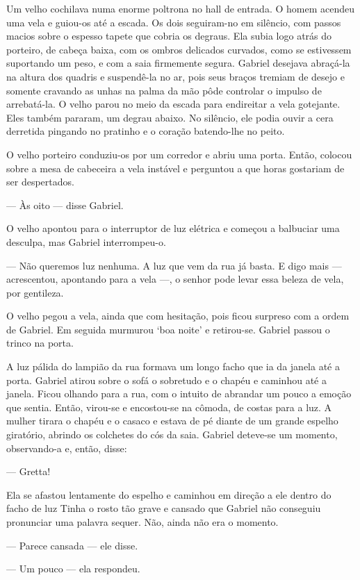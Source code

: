 Um velho cochilava numa enorme poltrona no hall de entrada. O homem
acendeu uma vela e guiou-os até a escada. Os dois seguiram-no em
silêncio, com  passos macios sobre o espesso tapete que cobria os
degraus. Ela subia logo atrás do porteiro, de cabeça baixa, com os
ombros delicados curvados, como se estivessem suportando um peso, e
com a saia firmemente segura. Gabriel desejava abraçá-la na altura dos
quadris e suspendê-la no ar, pois seus braços tremiam de desejo e
somente cravando as unhas na palma da mão pôde controlar o impulso de
arrebatá-la. O velho parou no meio da escada para endireitar a vela
gotejante. Eles também pararam, um degrau abaixo. No silêncio, ele
podia ouvir a cera derretida pingando no pratinho e o coração
batendo-lhe no peito.

O velho porteiro conduziu-os por um corredor e abriu uma porta. Então,
colocou sobre a mesa de cabeceira a vela instável e perguntou a que
horas gostariam de ser despertados.

--- Às oito --- disse Gabriel.

O velho apontou para o interruptor de luz elétrica e começou a
balbuciar uma desculpa, mas Gabriel interrompeu-o.

--- Não queremos luz nenhuma. A luz que vem da rua já basta. E digo
mais --- acrescentou, apontando para a vela ---, o senhor pode levar
essa beleza de vela, por gentileza.

O velho pegou a vela, ainda que com hesitação, pois ficou
surpreso com a ordem de Gabriel. Em seguida murmurou `boa
noite' e retirou-se. Gabriel passou o trinco na porta.

A luz pálida do lampião da rua formava um longo facho que ia da janela
até a porta. Gabriel atirou sobre o sofá o sobretudo e o chapéu e
caminhou até a janela. Ficou olhando para a rua, com o intuito de
abrandar um pouco a emoção que sentia. Então, virou-se e encostou-se
na cômoda, de costas para a luz. A mulher tirara o chapéu e o casaco e
estava de pé diante de um grande espelho giratório, abrindo os
colchetes do cós da saia. Gabriel deteve-se um momento, observando-a
e, então, disse:

--- Gretta!

Ela se afastou lentamente do espelho e caminhou em direção a ele
dentro do facho de luz Tinha o rosto tão grave e cansado que Gabriel
não conseguiu pronunciar uma palavra sequer. Não, ainda não era o
momento.

--- Parece cansada --- ele disse.

--- Um pouco --- ela respondeu.

